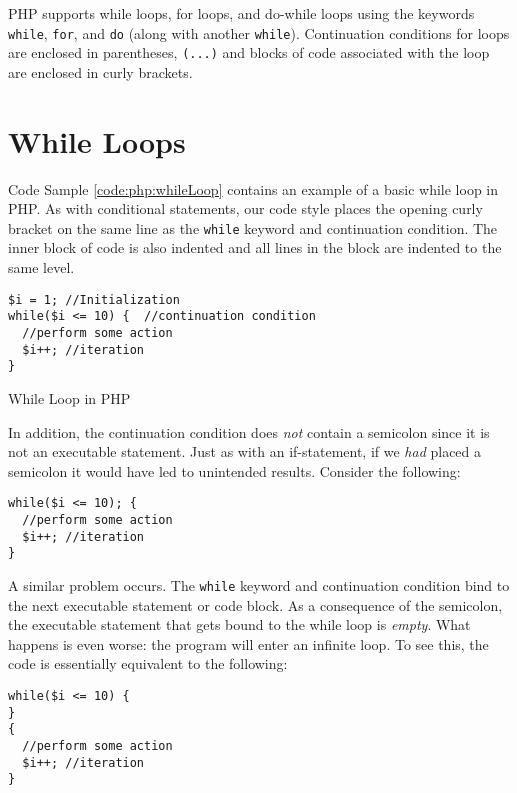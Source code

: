 

PHP supports while loops, for loops, and do-while loops using the keywords
\texttt{while}, \texttt{for}, and \texttt{do} (along with 
another \texttt{while}).  Continuation conditions for loops are 
enclosed in parentheses, \texttt{(...)} and blocks of code
associated with the loop are enclosed in curly brackets.  

\section{While Loops}

Code Sample \ref{code:php:whileLoop} contains an example of a basic
while loop in PHP.  As with conditional statements, our code style
places the opening curly bracket on the same line as the \texttt{while}
keyword and continuation condition.  The inner block of code is also
indented and all lines in the block are indented to the same level.

\begin{listing}
\begin{verbatim}
$i = 1; //Initialization
while($i <= 10) {  //continuation condition
  //perform some action
  $i++; //iteration
}
\end{verbatim}
  \caption{While Loop in PHP}
  \label{code:php:whileLoop}
\end{listing}

In addition, the continuation condition does \emph{not} contain 
a semicolon since it is not an executable statement.  Just as with
an if-statement, if we \emph{had} placed a semicolon it would 
have led to unintended results.  Consider the following:

\begin{verbatim}
while($i <= 10); {
  //perform some action
  $i++; //iteration
}
\end{verbatim}

A similar problem occurs.  The \texttt{while} keyword and
continuation condition bind to the next executable statement or
code block.  As a consequence of the semicolon, the executable
statement that gets bound to the while loop is \emph{empty}.  What
happens is even worse: the program will enter an infinite loop.  To
see this, the code is essentially equivalent to the following:

\begin{verbatim}
while($i <= 10) {
}
{
  //perform some action
  $i++; //iteration
}
\end{verbatim}

